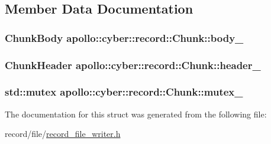 \subsection{Member Data Documentation}
\hypertarget{structapollo_1_1cyber_1_1record_1_1Chunk_a00672597f6ebfdf2dbeaabd580d9909b}{
\subsubsection[{body\-\_\-}]{\setlength{\rightskip}{0pt plus 5cm}Chunk\-Body apollo\-::cyber\-::record\-::\-Chunk\-::body\-\_\-}}\label{structapollo_1_1cyber_1_1record_1_1Chunk_a00672597f6ebfdf2dbeaabd580d9909b}
\hypertarget{structapollo_1_1cyber_1_1record_1_1Chunk_a8dbd3eaef5f4c44b84b4003acaa2fc0b}{
\subsubsection[{header\-\_\-}]{\setlength{\rightskip}{0pt plus 5cm}Chunk\-Header apollo\-::cyber\-::record\-::\-Chunk\-::header\-\_\-}}\label{structapollo_1_1cyber_1_1record_1_1Chunk_a8dbd3eaef5f4c44b84b4003acaa2fc0b}
\hypertarget{structapollo_1_1cyber_1_1record_1_1Chunk_af89d9a0952404a4d3f3877da67b40128}{
\subsubsection[{mutex\-\_\-}]{\setlength{\rightskip}{0pt plus 5cm}std\-::mutex apollo\-::cyber\-::record\-::\-Chunk\-::mutex\-\_\-}}\label{structapollo_1_1cyber_1_1record_1_1Chunk_af89d9a0952404a4d3f3877da67b40128}


The documentation for this struct was generated from the following file\-:\begin{DoxyCompactItemize}
\item 
record/file/\hyperlink{record__file__writer_8h}{record\-\_\-file\-\_\-writer.\-h}\end{DoxyCompactItemize}
